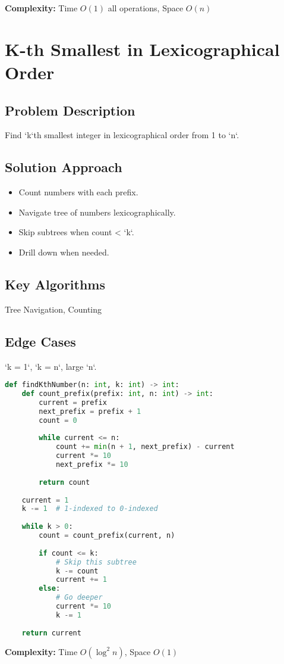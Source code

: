 \documentclass[10pt, a4paper]{article}
\begin{document}
\textbf{Complexity:} Time $O(1)$ all operations, Space $O(n)$

\section{K-th Smallest in Lexicographical Order}
\subsection*{Problem Description}
Find `k`th smallest integer in lexicographical order from 1 to `n`.

\subsection*{Solution Approach}
\begin{itemize}
    \item Count numbers with each prefix.
    \item Navigate tree of numbers lexicographically.
    \item Skip subtrees when count < `k`.
    \item Drill down when needed.
\end{itemize}

\subsection*{Key Algorithms}
Tree Navigation, Counting

\subsection*{Edge Cases}
`k = 1`, `k = n`, large `n`.

\begin{lstlisting}[language=Python]
def findKthNumber(n: int, k: int) -> int:
    def count_prefix(prefix: int, n: int) -> int:
        current = prefix
        next_prefix = prefix + 1
        count = 0
        
        while current <= n:
            count += min(n + 1, next_prefix) - current
            current *= 10
            next_prefix *= 10
        
        return count
    
    current = 1
    k -= 1  # 1-indexed to 0-indexed
    
    while k > 0:
        count = count_prefix(current, n)
        
        if count <= k:
            # Skip this subtree
            k -= count
            current += 1
        else:
            # Go deeper
            current *= 10
            k -= 1
    
    return current
\end{lstlisting}
\textbf{Complexity:} Time $O(\log^2 n)$, Space $O(1)$
\end{document}
